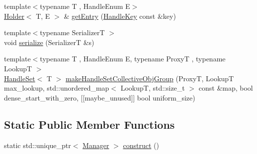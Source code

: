 \begin{DoxyCompactItemize}
{\footnotesize template$<$typename T , Handle\+Enum E$>$ }\\\hyperlink{structvt_1_1rdma_1_1_holder}{Holder}$<$ T, E $>$ \& \hyperlink{structvt_1_1rdma_1_1_manager_a60c463246971a6d782e55f13fd60d092}{get\+Entry} (\hyperlink{structvt_1_1rdma_1_1_handle_key}{Handle\+Key} const \&key)
\item 
{\footnotesize template$<$typename SerializerT $>$ }\\void \hyperlink{structvt_1_1rdma_1_1_manager_a72546bf67b9df25c54bfca2106872ea3}{serialize} (SerializerT \&s)
\item 
{\footnotesize template$<$typename T , Handle\+Enum E, typename ProxyT , typename LookupT $>$ }\\\hyperlink{structvt_1_1rdma_1_1_handle_set}{Handle\+Set}$<$ T $>$ \hyperlink{structvt_1_1rdma_1_1_manager_a95a3fc225ba480a9931fa33cc3cc8552}{make\+Handle\+Set\+Collective\+Obj\+Group} (ProxyT, LookupT max\+\_\+lookup, std\+::unordered\+\_\+map$<$ LookupT, std\+::size\+\_\+t $>$ const \&map, bool dense\+\_\+start\+\_\+with\+\_\+zero, \mbox{[}\mbox{[}maybe\+\_\+unused\mbox{]}\mbox{]} bool uniform\+\_\+size)
\end{DoxyCompactItemize}
\subsection*{Static Public Member Functions}
\begin{DoxyCompactItemize}
\item 
static std\+::unique\+\_\+ptr$<$ \hyperlink{structvt_1_1rdma_1_1_manager}{Manager} $>$ \hyperlink{structvt_1_1rdma_1_1_manager_ab79a91b3feabfc37e6f0b5000e9d3949}{construct} ()
\end{DoxyCompactItemize}
